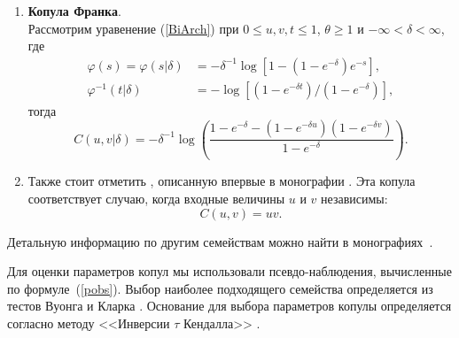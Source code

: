 \begin{enumerate}

\item \textbf{Копула Франка}.\\
Рассмотрим уравенение (\ref{BiArch}) при $0 \le u,v,t \le 1$, $\theta \ge 1$ и $-\infty < \delta < \infty$, где
\begin{equation}
\begin{aligned}
    \varphi (s) = \varphi(s| \delta) &= -\delta^{-1}\log{[1-(1-e^{-\delta})e^{-s}]}, \\
    \varphi^{-1}(t| \delta) &= -\log{[(1-e^{-\delta t})/(1-e^{-\delta})]},
\end{aligned} \nonumber 
\end{equation}
тогда
\begin{equation}
    C(u,v|\delta) = -\delta^{-1} \log{\left(\frac{1 - e^{-\delta} - (1 - e^{-\delta u})(1 - e^{-\delta v})}{1 - e^{-\delta}}\right)}. \nonumber
    \end{equation}

\item Также стоит отметить , описанную впервые в монографии \cite{Nelsen1999}. 
Эта копула соответствует случаю, когда входные величины $u$ и $v$ независимы:
\begin{equation}
    C(u,v) = uv. \nonumber
\end{equation} 
\end{enumerate}
%
Детальную информацию по другим семействам можно найти в монографиях~\cite{Joe2014, Nelsen1999}.

Для оценки параметров копул мы использовали псевдо-наблюдения, вычисленные по формуле~(\ref{pobs}). 
Выбор наиболее подходящего семейства определяется из тестов Вуонга и Кларка \cite{Clarke2007, Vuong1989}. 
Основание для выбора параметров копулы определяется согласно методу <<Инверсии $\tau$ Кендалла>> \cite{Koj2010}. 

